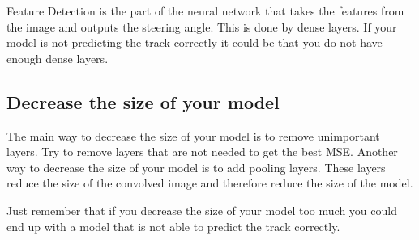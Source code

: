 \documentclass[11pt]{report}
\begin{document}
Feature Detection is the part of the neural network that takes the features from the image and outputs the steering angle. This is done by dense layers. If your model is not predicting the track correctly it could be that you do not have enough dense layers.

\subsection{Decrease the size of your model}

The main way to decrease the size of your model is to remove unimportant layers. Try to remove layers that are not needed to get the best MSE. Another way to decrease the size of your model is to add pooling layers. These layers reduce the size of the convolved image and therefore reduce the size of the model.

Just remember that if you decrease the size of your model too much you could end up with a model that is not able to predict the track correctly.
\end{document}
